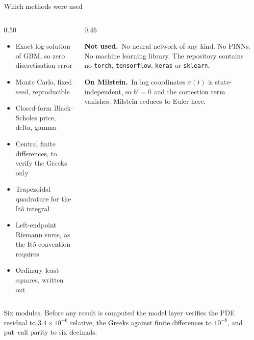 \documentclass[aspectratio=169,11pt]{beamer}
\newcommand{\lead}[1]{{\sffamily\bfseries\color{accent}#1}}
\begin{document}
\begin{frame}{Which methods were used}
\begin{columns}[T]
\begin{column}{0.50\textwidth}
\small
\begin{itemize}\itemsep1pt
  \item Exact log-solution of GBM, so zero discretisation error
  \item Monte Carlo, fixed seed, reproducible
  \item Closed-form Black--Scholes price, delta, gamma
  \item Central finite differences, to verify the Greeks only
  \item Trapezoidal quadrature for the It\^o integral
  \item Left-endpoint Riemann sums, as the It\^o convention requires
  \item Ordinary least squares, written out
\end{itemize}
\end{column}
\begin{column}{0.46\textwidth}
\begin{callout}
\small\lead{Not used.}\ No neural network of any kind. No PINNs. No machine learning library.
The repository contains no \texttt{torch}, \texttt{tensorflow}, \texttt{keras} or
\texttt{sklearn}.
\end{callout}
\vspace{0.5em}
\begin{inknote}
\small\lead{On Milstein.}\ In log coordinates $\sigma(t)$ is state-independent, so $b'=0$ and
the correction term vanishes. Milstein reduces to Euler here.
\end{inknote}
\end{column}
\end{columns}
\vspace{0.3em}
{\scriptsize\color{muted}Six modules. Before any result is computed the model layer verifies the
PDE residual to $3.4\times10^{-6}$ relative, the Greeks against finite differences to $10^{-8}$,
and put--call parity to six decimals.}
\end{frame}
\end{document}
